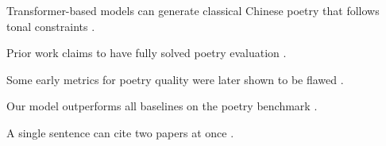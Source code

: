 \documentclass{article}
\begin{document}
Transformer-based models can generate classical Chinese poetry that follows tonal
constraints \cite{realgood2023}.

Prior work claims to have fully solved poetry evaluation \cite{fabricated2024}.

Some early metrics for poetry quality were later shown to be flawed \cite{retracted2020}.

Our model outperforms all baselines on the poetry benchmark \cite{mismatch2022}.

A single sentence can cite two papers at once \cite{realgood2023, fabricated2024}.


\end{document}
